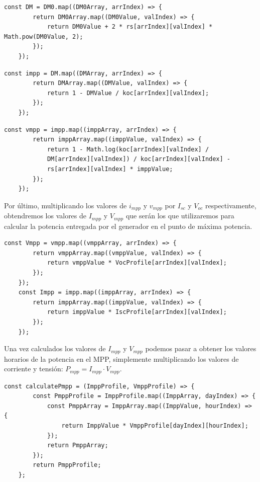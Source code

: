 \begin{lstlisting}[style=ES6, caption={Cálculo de $D_{M}$}]
	const DM = DM0.map((DM0Array, arrIndex) => {
		return DM0Array.map((DM0Value, valIndex) => {
			return DM0Value + 2 * rs[arrIndex][valIndex] * Math.pow(DM0Value, 2);
		});
	});
\end{lstlisting} 

\begin{lstlisting}[style=ES6, caption={Cálculo de $i_{mpp}$}]
	const impp = DM.map((DMArray, arrIndex) => {
		return DMArray.map((DMValue, valIndex) => {
			return 1 - DMValue / koc[arrIndex][valIndex];
		});
	});
\end{lstlisting} 


\begin{lstlisting}[style=ES6, caption={Cálculo de $v_{mpp}$}]
	const vmpp = impp.map((imppArray, arrIndex) => {
		return imppArray.map((imppValue, valIndex) => {
			return 1 - Math.log(koc[arrIndex][valIndex] / 
			DM[arrIndex][valIndex]) / koc[arrIndex][valIndex] - 
			rs[arrIndex][valIndex] * imppValue;
		});
	});
\end{lstlisting} 

Por último, multiplicando los valores de $i_{mpp}$ y $v_{mpp}$ por $I_{sc}$ y $V_{oc}$ respectivamente, obtendremos los valores de $I_{mpp}$ y $V_{mpp}$ que serán los que utilizaremos para calcular la potencia entregada por el generador en el punto de máxima potencia.
\begin{lstlisting}[style=ES6, caption={Cálculo de $V_{mpp}$ y $I_{mpp}$}]
	const Vmpp = vmpp.map((vmppArray, arrIndex) => {
		return vmppArray.map((vmppValue, valIndex) => {
			return vmppValue * VocProfile[arrIndex][valIndex];
		});
	});
	const Impp = impp.map((imppArray, arrIndex) => {
		return imppArray.map((imppValue, valIndex) => {
			return imppValue * IscProfile[arrIndex][valIndex];
		});
	});

\end{lstlisting} 

Una vez calculados los valores de $I_{mpp}$ y $V_{mpp}$ podemos pasar a obtener los valores horarios de la potencia en el MPP, simplemente multiplicando los valores de corriente y tensión: $P_{mpp} = I_{mpp} \cdot V_{mpp}$.

\begin{lstlisting}[style=ES6, caption={Cálculo de $P_{mpp}$}]
	const calculatePmpp = (ImppProfile, VmppProfile) => {
		const PmppProfile = ImppProfile.map((ImppArray, dayIndex) => {
			const PmppArray = ImppArray.map((ImppValue, hourIndex) => {
				return ImppValue * VmppProfile[dayIndex][hourIndex];
			});
			return PmppArray;
		});
		return PmppProfile;
	};

\end{lstlisting} 
\newpage

